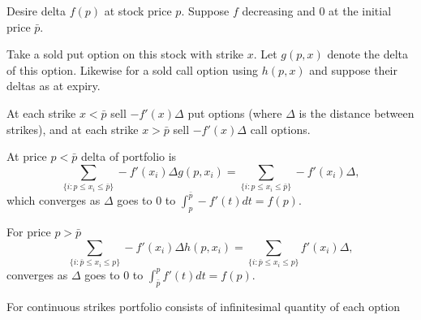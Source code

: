 \documentclass[10pt]{article}
\begin{document}
Desire delta $f(p)$ at stock price $p$. Suppose $f$ decreasing and $0$ at the initial price $\bar p$. 

Take a sold put option on this stock with strike $x$. Let $g(p,x)$ denote the delta of this option. Likewise for a sold call option using $h(p,x)$ and suppose their deltas as at expiry.

At each strike $x<\bar p$ sell $-f'(x)\Delta$ put options (where $\Delta$ is the distance between strikes), and at each strike $x>\bar p$ sell $-f'(x)\Delta$ call options. 

At price $p<\bar p$ delta of portfolio is 
\[
\sum_{\{i: p \leq x_i \leq \bar p\}} -f'(x_i) \Delta g(p,x_i) = \sum_{\{i: p \leq x_i \leq \bar p\}} -f'(x_i) \Delta, 
\]
which converges as $\Delta$ goes to $0$ to $\int_p^{\bar p} -f'(t)dt = f(p)$.

For price $p>\bar p$ 
\[
\sum_{\{i: \bar p \leq x_i \leq p\}} -f'(x_i) \Delta h(p,x_i) = \sum_{\{i:\bar p \leq x_i \leq p\}} f'(x_i) \Delta, 
\]
converges as $\Delta$ goes to $0$ to $\int_{\bar p}^p f'(t)dt = f(p)$.

\bi
\pt For continuous strikes portfolio consists of infinitesimal quantity of each option
\ei
\end{document}
